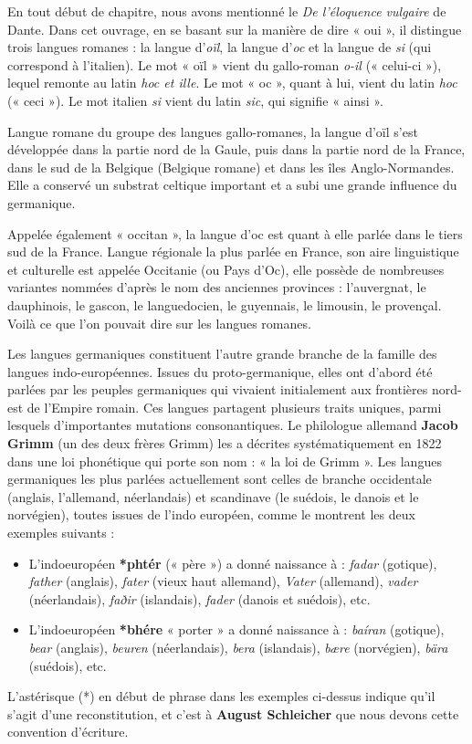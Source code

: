 En tout début de chapitre, nous avons mentionné le \textit{De l’éloquence vulgaire} de Dante. Dans cet ouvrage, en se basant sur la manière de dire « oui », il distingue trois langues romanes : la langue d’\textit{oïl}, la langue d’\textit{oc} et la langue de \textit{si} (qui correspond à l’italien). Le mot « oïl » vient du gallo-roman \textit{o-il} (« celui-ci »), lequel remonte au latin \textit{hoc et ille}. Le mot « oc », quant à lui, vient du latin \textit{hoc} (« ceci »). Le mot italien \textit{si} vient du latin \textit{sic}, qui signifie « ainsi ».

Langue romane du groupe des langues gallo-romanes, la langue d’oïl s’est développée dans la partie nord de la Gaule, puis dans la partie nord de la France, dans le sud de la Belgique (Belgique romane) et dans les îles Anglo-Normandes. Elle a conservé un substrat celtique important et a subi une grande influence du germanique.

Appelée également « occitan », la langue d’oc est quant à elle parlée dans le tiers sud de la France. Langue régionale la plus parlée en France, son aire linguistique et culturelle est appelée Occitanie (ou Pays d’Oc), elle possède de nombreuses variantes nommées d’après le nom des anciennes provinces : l’auvergnat, le dauphinois, le gascon, le languedocien, le guyennais, le limousin, le provençal. Voilà ce que l’on pouvait dire sur les langues romanes.

Les langues germaniques constituent l’autre grande branche de la famille des langues indo-européennes. Issues du proto-germanique, elles ont d’abord été parlées par les peuples germaniques qui vivaient initialement aux frontières nord-est de l’Empire romain. Ces langues partagent plusieurs traits uniques, parmi lesquels d’importantes mutations consonantiques. Le philologue allemand \textbf{Jacob Grimm} (un des deux frères Grimm) les a décrites systématiquement en 1822 dans une loi phonétique qui porte son nom : « la loi de Grimm ». Les langues germaniques les plus parlées actuellement sont celles de branche occidentale (anglais, l’allemand, néerlandais) et scandinave (le suédois, le danois et le norvégien), toutes issues de l’indo européen, comme le montrent les deux exemples suivants :
\begin{itemize}
\item L’indoeuropéen \textbf{*phtér} (« père ») a donné naissance à : \textit{fadar} (gotique), \textit{father} (anglais), \textit{fater} (vieux haut allemand), \textit{Vater} (allemand), \textit{vader} (néerlandais), \textit{faðir} (islandais), \textit{fader} (danois et
suédois), etc.
\item L’indoeuropéen \textbf{*bhére} « porter » a donné naissance à : \textit{baíran} (gotique), \textit{bear} (anglais), \textit{beuren} (néerlandais), \textit{bera} (islandais), \textit{bære} (norvégien), \textit{bära} (suédois), etc.
\end{itemize}
L’astérisque (*) en début de phrase dans les exemples ci-dessus indique qu’il s’agit d’une reconstitution, et c’est à \textbf{August Schleicher} que nous devons cette convention d’écriture.

